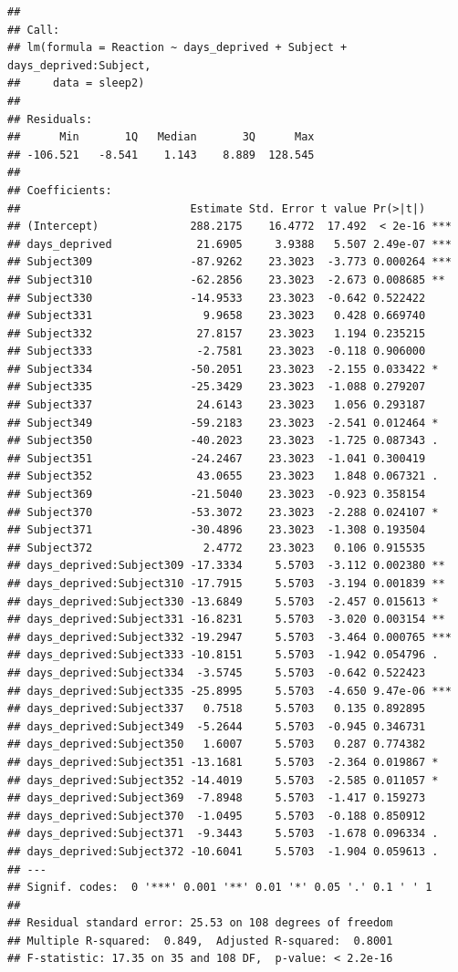 \documentclass[
]{book}
\begin{document}
\begin{verbatim}
## 
## Call:
## lm(formula = Reaction ~ days_deprived + Subject + days_deprived:Subject, 
##     data = sleep2)
## 
## Residuals:
##      Min       1Q   Median       3Q      Max 
## -106.521   -8.541    1.143    8.889  128.545 
## 
## Coefficients:
##                          Estimate Std. Error t value Pr(>|t|)    
## (Intercept)              288.2175    16.4772  17.492  < 2e-16 ***
## days_deprived             21.6905     3.9388   5.507 2.49e-07 ***
## Subject309               -87.9262    23.3023  -3.773 0.000264 ***
## Subject310               -62.2856    23.3023  -2.673 0.008685 ** 
## Subject330               -14.9533    23.3023  -0.642 0.522422    
## Subject331                 9.9658    23.3023   0.428 0.669740    
## Subject332                27.8157    23.3023   1.194 0.235215    
## Subject333                -2.7581    23.3023  -0.118 0.906000    
## Subject334               -50.2051    23.3023  -2.155 0.033422 *  
## Subject335               -25.3429    23.3023  -1.088 0.279207    
## Subject337                24.6143    23.3023   1.056 0.293187    
## Subject349               -59.2183    23.3023  -2.541 0.012464 *  
## Subject350               -40.2023    23.3023  -1.725 0.087343 .  
## Subject351               -24.2467    23.3023  -1.041 0.300419    
## Subject352                43.0655    23.3023   1.848 0.067321 .  
## Subject369               -21.5040    23.3023  -0.923 0.358154    
## Subject370               -53.3072    23.3023  -2.288 0.024107 *  
## Subject371               -30.4896    23.3023  -1.308 0.193504    
## Subject372                 2.4772    23.3023   0.106 0.915535    
## days_deprived:Subject309 -17.3334     5.5703  -3.112 0.002380 ** 
## days_deprived:Subject310 -17.7915     5.5703  -3.194 0.001839 ** 
## days_deprived:Subject330 -13.6849     5.5703  -2.457 0.015613 *  
## days_deprived:Subject331 -16.8231     5.5703  -3.020 0.003154 ** 
## days_deprived:Subject332 -19.2947     5.5703  -3.464 0.000765 ***
## days_deprived:Subject333 -10.8151     5.5703  -1.942 0.054796 .  
## days_deprived:Subject334  -3.5745     5.5703  -0.642 0.522423    
## days_deprived:Subject335 -25.8995     5.5703  -4.650 9.47e-06 ***
## days_deprived:Subject337   0.7518     5.5703   0.135 0.892895    
## days_deprived:Subject349  -5.2644     5.5703  -0.945 0.346731    
## days_deprived:Subject350   1.6007     5.5703   0.287 0.774382    
## days_deprived:Subject351 -13.1681     5.5703  -2.364 0.019867 *  
## days_deprived:Subject352 -14.4019     5.5703  -2.585 0.011057 *  
## days_deprived:Subject369  -7.8948     5.5703  -1.417 0.159273    
## days_deprived:Subject370  -1.0495     5.5703  -0.188 0.850912    
## days_deprived:Subject371  -9.3443     5.5703  -1.678 0.096334 .  
## days_deprived:Subject372 -10.6041     5.5703  -1.904 0.059613 .  
## ---
## Signif. codes:  0 '***' 0.001 '**' 0.01 '*' 0.05 '.' 0.1 ' ' 1
## 
## Residual standard error: 25.53 on 108 degrees of freedom
## Multiple R-squared:  0.849,  Adjusted R-squared:  0.8001 
## F-statistic: 17.35 on 35 and 108 DF,  p-value: < 2.2e-16
\end{verbatim}
\end{document}
